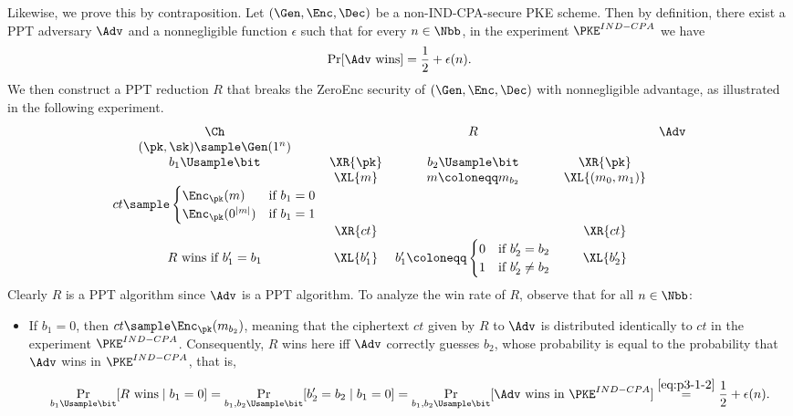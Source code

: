 \begin{answer}[i]
    Likewise, we prove this by contraposition.  Let $(\Gen, \Enc, \Dec)$ be a non-IND-CPA-secure PKE scheme. Then by definition, there exist a PPT adversary $\Adv$ and a nonnegligible function $\epsilon$ such that for every $n\in\Nbb$, in the experiment $\PKE^{IND-CPA}$ we have
    \begin{equation}\label{eq:p3-1-2}
        \Pr[\Adv \textrm{ wins}] =\frac{1}{2}+\epsilon(n).
    \end{equation}
    We then construct a PPT reduction $R$ that breaks the ZeroEnc security of $(\Gen, \Enc, \Dec)$ with nonnegligible advantage, as illustrated in the following experiment.
    {
        \[
            \begin{array}{@{} c c c c c@{}}
            \Ch & & R & & \Adv \\
            (\pk, \sk)\sample \Gen(1^n) & &  & & \\
            b_1\Usample\bit & \XR{\pk} &  b_2\Usample\bit & \XR{\pk} &\\
            & \XL{m} & m\coloneqq m_{b_2} & \XL{(m_0, m_1)} & \\
            ct\sample \begin{cases}
                \Enc_{\pk}(m) & \textrm{if } b_1=0\\
                \Enc_{\pk}(0^{|m|}) & \textrm{if } b_1=1\\
            \end{cases}  & & &  &\\
            & \XR{ct}& & \XR{ct} &\\
            \text{$R$ wins if $b_1' = b_1$} & \XL{b_1'} & b_1'\coloneqq \begin{cases}
                0 & \textrm{if } b_2' = b_2\\
                1 & \textrm{if } b_2' \neq b_2
            \end{cases} & \XL{b_2'} & \\
            \end{array}
        \]
        \label{fig:p3-game3}
    }
    Clearly $R$ is a PPT algorithm since $\Adv$ is a PPT algorithm.
    To analyze the win rate of $R$, observe that for all $n\in\Nbb$:
    \begin{itemize}
        \item If $b_1=0$, then $ct\sample \Enc_\pk(m_{b_2})$, meaning that the ciphertext $ct$ given by $R$ to $\Adv$ is distributed identically to $ct$ in the experiment $\PKE^{IND-CPA}$.        
        Consequently, $R$ wins here iff $\Adv$ correctly guesses $b_2$, whose probability is equal to the probability that $\Adv$ wins in $\PKE^{IND-CPA}$, that is,
        \[
            \Pr_{b_1\Usample\bit}[ R \textrm{ wins}\mid b_1=0]
            =\Pr_{b_1,b_2\Usample\bit}[ b_2'=b_2 \mid b_1=0]
            =\Pr_{b_1,b_2\Usample\bit}[ \Adv \textrm{ wins in } \PKE^{IND-CPA}]
            \stackrel{\eqref{eq:p3-1-2}}= \frac{1}{2}+\epsilon(n).
        \]


\end{itemize}
\end{answer}
